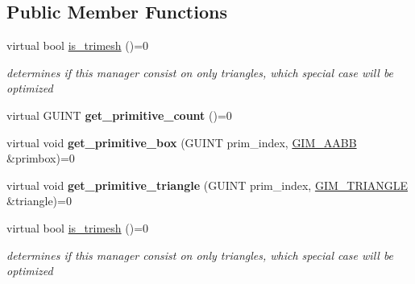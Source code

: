 \subsection*{Public Member Functions}
\begin{DoxyCompactItemize}
\item 
\mbox{\label{classGIM__PRIMITIVE__MANAGER__PROTOTYPE_aaad51538aaf2c2652c7e202a9f2d57a5}} 
virtual bool \hyperlink{classGIM__PRIMITIVE__MANAGER__PROTOTYPE_aaad51538aaf2c2652c7e202a9f2d57a5}{is\+\_\+trimesh} ()=0
\begin{DoxyCompactList}\small\item\em determines if this manager consist on only triangles, which special case will be optimized \end{DoxyCompactList}\item 
\mbox{\label{classGIM__PRIMITIVE__MANAGER__PROTOTYPE_a94c3fab9efdfec58d4c55394f8531463}} 
virtual G\+U\+I\+NT {\bfseries get\+\_\+primitive\+\_\+count} ()=0
\item 
\mbox{\label{classGIM__PRIMITIVE__MANAGER__PROTOTYPE_a346c6eddcf63f67097a3d564ada57661}} 
virtual void {\bfseries get\+\_\+primitive\+\_\+box} (G\+U\+I\+NT prim\+\_\+index, \hyperlink{classGIM__AABB}{G\+I\+M\+\_\+\+A\+A\+BB} \&primbox)=0
\item 
\mbox{\label{classGIM__PRIMITIVE__MANAGER__PROTOTYPE_ad123d015b328ccfd1adee56517fd4b17}} 
virtual void {\bfseries get\+\_\+primitive\+\_\+triangle} (G\+U\+I\+NT prim\+\_\+index, \hyperlink{classGIM__TRIANGLE}{G\+I\+M\+\_\+\+T\+R\+I\+A\+N\+G\+LE} \&triangle)=0
\item 
\mbox{\label{classGIM__PRIMITIVE__MANAGER__PROTOTYPE_aaad51538aaf2c2652c7e202a9f2d57a5}} 
virtual bool \hyperlink{classGIM__PRIMITIVE__MANAGER__PROTOTYPE_aaad51538aaf2c2652c7e202a9f2d57a5}{is\+\_\+trimesh} ()=0
\begin{DoxyCompactList}\small\item\em determines if this manager consist on only triangles, which special case will be optimized \end{DoxyCompactList}\item 
\mbox{\label{classGIM__PRIMITIVE__MANAGER__PROTOTYPE_a94c3fab9efdfec58d4c55394f8531463}} 

\end{DoxyCompactItemize}
